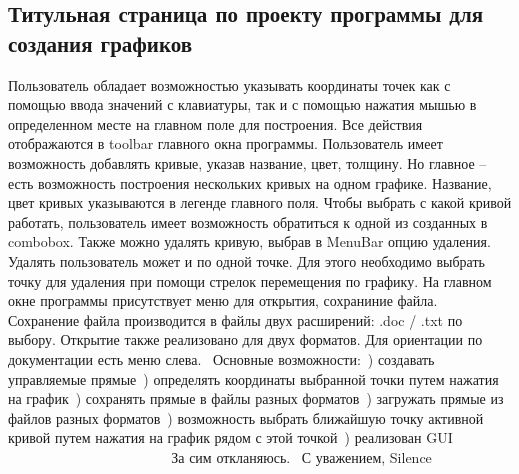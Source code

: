 \subsection*{Титульная страница по проекту программы для создания графиков }

Пользователь обладает возможностью указывать координаты точек как с помощью ввода значений с клавиатуры, так и с помощью нажатия мышью в определенном месте на главном поле для построения. Все действия отображаются в toolbar главного окна программы. Пользователь имеет возможность добавлять кривые, указав название, цвет, толщину. Но главное – есть возможность построения нескольких кривых на одном графике. Название, цвет кривых указываются в легенде главного поля. Чтобы выбрать с какой кривой работать, пользователь имеет возможность обратиться к одной из созданных в combobox. Также можно удалять кривую, выбрав в Menu\+Bar опцию удаления. Удалять пользователь может и по одной точке. Для этого необходимо выбрать точку для удаления при помощи стрелок перемещения по графику. На главном окне программы присутствует меню для открытия, сохраниние файла. Сохранение файла производится в файлы двух расширений\+: .doc / .txt по выбору. Открытие также реализовано для двух форматов. Для ориентации по документации есть меню слева.~\newline
Основные возможности\+:~) создавать управляемые прямые~) определять координаты выбранной точки путем нажатия на график~) сохранять прямые в файлы разных форматов~) загружать прямые из файлов разных форматов~) возможность выбрать ближайшую точку активной кривой путем нажатия на график рядом с этой точкой~) реализован G\+UI~\newline
~\newline
~\newline
~\newline
~\newline
~\newline
~\newline
~\newline
~\newline
~\newline
~\newline
~\newline
~\newline
~\newline
~\newline
~\newline
~\newline
~\newline
~\newline
 За сим откланяюсь.~\newline
 С уважением, Silence~\newline

